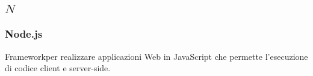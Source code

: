 \subsection*{\quad$N\quad$}
\subsubsection*{Node.js}
Framework\glosp per realizzare applicazioni Web in JavaScript che permette l'esecuzione di codice client e server-side\glo.